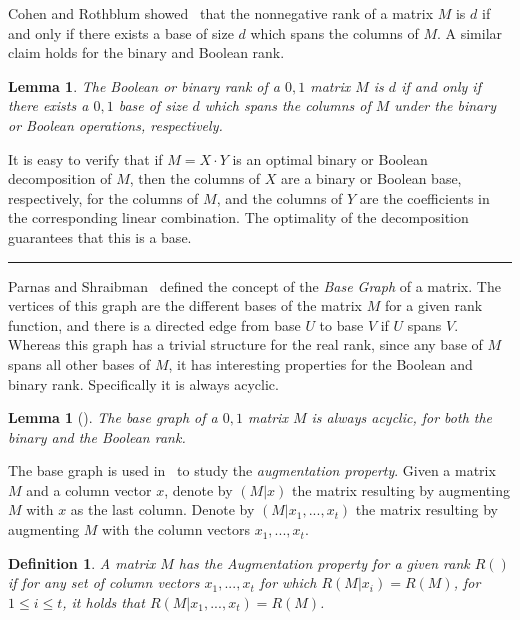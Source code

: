\documentclass[11pt]{article}
\newtheorem{definition}[theorem]{Definition}
\newtheorem{lemma}[theorem]{Lemma}
\newcommand{\qedsymb}{\hfill{\rule{2mm}{2mm}}}
\renewenvironment{proof}[1][]{\begin{trivlist}
\item[\hspace{\labelsep}{\bf\noindent Proof#1:\/}] }{\qedsymb\end{trivlist}}
\begin{document}
Cohen and Rothblum showed~\cite{Cohen} that the nonnegative rank of a matrix $M$ is $d$ if and only if there exists a base of size $d$ which spans the columns of $M$.
A similar claim holds for the binary and Boolean rank.

\begin{lemma}
The Boolean or binary rank of a $0,1$ matrix $M$ is $d$ if and only if there exists a $0,1$ base of size $d$ which spans the columns of $M$ under the binary or Boolean operations, respectively.
\end{lemma}
\begin{proof}
It is easy to verify that if $M = X\cdot Y$ is an optimal binary or Boolean decomposition of $M$,
then the columns of $X$ are a binary or Boolean base, respectively, for the columns of $M$, and the columns of $Y$ are the coefficients in the corresponding linear combination.
The optimality of the decomposition guarantees that this is a base.
\end{proof}

Parnas and Shraibman~\cite{parnas2018augmentation} defined the concept of the {\em Base Graph} of a matrix.
The vertices of this graph are the different bases of the matrix $M$ for a given rank function,
and there is a directed edge from base $U$ to base $V$ if $U$ spans $V$.
Whereas this graph has a trivial structure for the real rank, since any base of  $M$ spans all other bases of $M$,
it has interesting properties for the Boolean and binary rank. Specifically it is always acyclic.

\begin{lemma}[\cite{parnas2018augmentation}]
The base graph of a $0,1$ matrix $M$ is always acyclic, for both the binary and the Boolean rank.
\end{lemma}

The base graph is used in~\cite{parnas2018augmentation} to study the {\em augmentation property}.
Given a matrix $M$ and a column vector $x$, denote by $(M|x)$
the matrix resulting by augmenting $M$ with $x$ as the last column.
Denote by $(M|x_1,...,x_t)$ the matrix resulting  by augmenting $M$  with the column vectors $x_1,...,x_t$.

\begin{definition}
A matrix $M$ has the {\em Augmentation property} for a given rank $R()$ if
for any set of column vectors $x_1,...,x_t$ for which $R(M|x_i) = R(M)$, for
$1\leq i \leq t$, it holds that $R(M|x_1,...,x_t)= R(M)$.
\end{definition}
\end{document}
